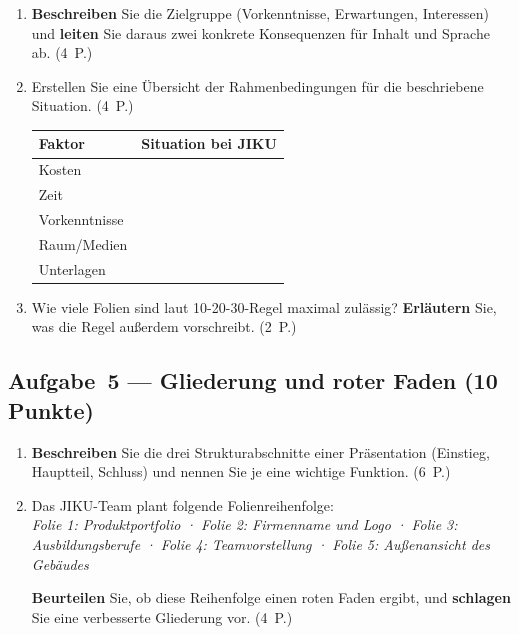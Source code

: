 \documentclass[11pt, a4paper]{article}
\begin{document}
\begin{enumerate}[label=(\alph*)]
  \item \textbf{Beschreiben} Sie die Zielgruppe (Vorkenntnisse, Erwartungen, Interessen) und
  \textbf{leiten} Sie daraus zwei konkrete Konsequenzen für Inhalt und Sprache ab. \hfill (4~P.)

  \vspace{6cm}

  \item Erstellen Sie eine Übersicht der Rahmenbedingungen für die beschriebene Situation. \hfill (4~P.)

  \bigskip

  \noindent
  \begin{tabular}{|p{3.5cm}|p{9cm}|}
  \hline
  \textbf{Faktor} & \textbf{Situation bei JIKU}\\
  \hline
  Kosten & \\[0.9cm]
  \hline
  Zeit & \\[0.9cm]
  \hline
  Vorkenntnisse & \\[0.9cm]
  \hline
  Raum/Medien & \\[0.9cm]
  \hline
  Unterlagen & \\[0.9cm]
  \hline
  \end{tabular}

  \bigskip

  \item Wie viele Folien sind laut 10-20-30-Regel maximal zulässig? \textbf{Erläutern} Sie,
  was die Regel außerdem vorschreibt. \hfill (2~P.)

  \vspace{3.5cm}
\end{enumerate}

\subsection*{Aufgabe~5 --- Gliederung und roter Faden (10 Punkte)}

\begin{enumerate}[label=(\alph*)]
  \item \textbf{Beschreiben} Sie die drei Strukturabschnitte einer Präsentation
  (Einstieg, Hauptteil, Schluss) und nennen Sie je eine wichtige Funktion. \hfill (6~P.)

  \vspace{8cm}

  \item Das JIKU-Team plant folgende Folienreihenfolge:\\[0.4em]
  \textit{Folie 1: Produktportfolio · Folie 2: Firmenname und Logo · Folie 3: Ausbildungsberufe
  · Folie 4: Teamvorstellung · Folie 5: Außenansicht des Gebäudes}

  \textbf{Beurteilen} Sie, ob diese Reihenfolge einen roten Faden ergibt, und
  \textbf{schlagen} Sie eine verbesserte Gliederung vor. \hfill (4~P.)

  \vspace{6cm}
\end{enumerate}
\end{document}
